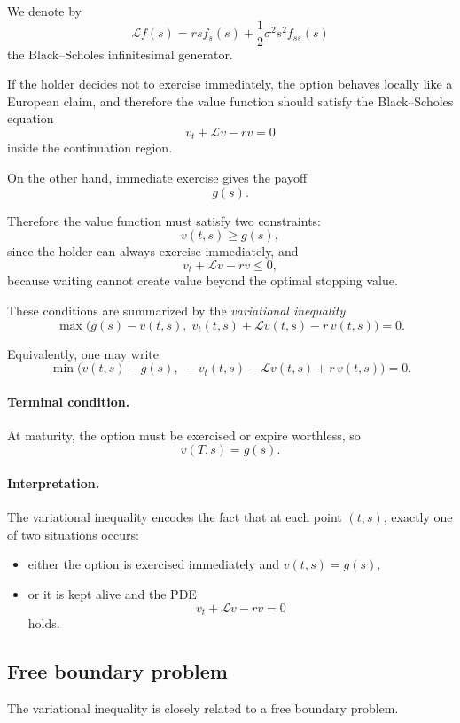 \documentclass[11pt]{article}
\theoremstyle{definition}
\theoremstyle{plain}
\begin{document}
We denote by
\[
\mathcal{L}f(s)
=
rs f_s(s)+\frac12 \sigma^2 s^2 f_{ss}(s)
\]
the Black--Scholes infinitesimal generator.

If the holder decides not to exercise immediately, the option behaves
locally like a European claim, and therefore the value function should
satisfy the Black--Scholes equation
\[
v_t + \mathcal{L}v - r v = 0
\]
inside the continuation region.

On the other hand, immediate exercise gives the payoff
\[
g(s).
\]

Therefore the value function must satisfy two constraints:
\[
v(t,s)\ge g(s),
\]
since the holder can always exercise immediately, and
\[
v_t+\mathcal{L}v-rv \le 0,
\]
because waiting cannot create value beyond the optimal stopping value.

These conditions are summarized by the \emph{variational inequality}
\[
\boxed{
\max\!\big(g(s)-v(t,s),\; v_t(t,s)+\mathcal{L}v(t,s)-r\,v(t,s)\big)=0.
}
\]

Equivalently, one may write
\[
\boxed{
\min\!\big(v(t,s)-g(s),\; -v_t(t,s)-\mathcal{L}v(t,s)+r\,v(t,s)\big)=0.
}
\]

\paragraph{Terminal condition.}
At maturity, the option must be exercised or expire worthless, so
\[
v(T,s)=g(s).
\]

\paragraph{Interpretation.}
The variational inequality encodes the fact that at each point
\((t,s)\), exactly one of two situations occurs:
\begin{itemize}[leftmargin=1.4em]
    \item either the option is exercised immediately and \(v(t,s)=g(s)\),
    \item or it is kept alive and the PDE
    \[
    v_t+\mathcal{L}v-rv=0
    \]
    holds.
\end{itemize}

\subsection{Free boundary problem}

The variational inequality is closely related to a free boundary problem.
\end{document}
